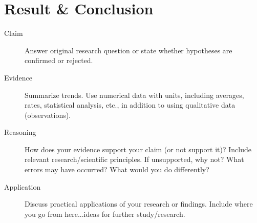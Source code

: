 \part{Result \& Conclusion}

\begin{description}
\item[Claim] Answer original research question or state whether hypotheses are confirmed or rejected.


\item[Evidence] Summarize trends. Use numerical data with units, including averages, rates, statistical analysis, etc., in addition to using qualitative data (observations).


\item[Reasoning] How does your evidence support your claim (or not support it)? Include relevant research/scientific principles. If unsupported, why not? What errors may have occurred? What would you do differently?


\item[Application] Discuss practical applications of your research or findings. Include where you go from here...ideas for further study/research.
\end{description}
